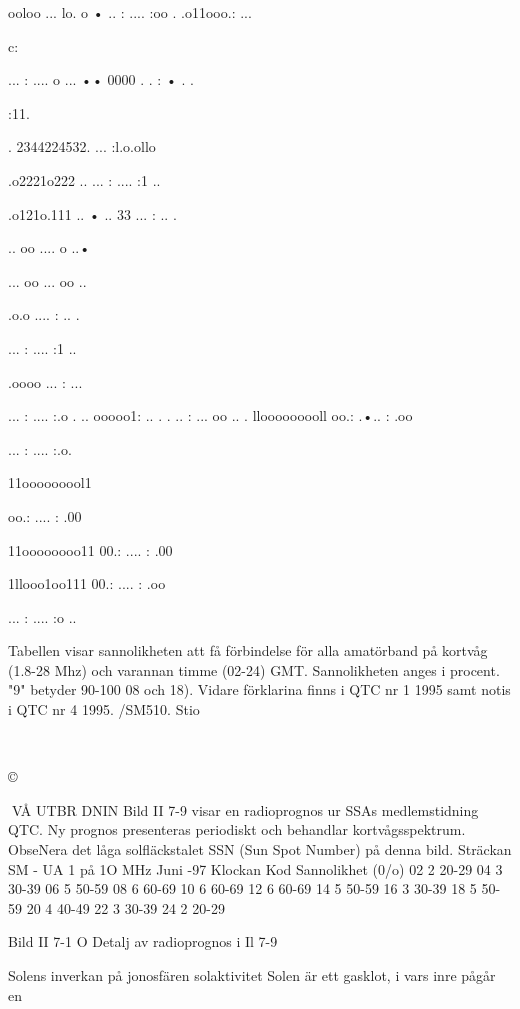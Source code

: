 ooloo ... lo. o
• .. : .... :oo .
.o11ooo.: ...

c:

... : .... o ...
•• 0000 . . : • . .

:11.

. 2344224532.
... :l.o.ollo

.o2221o222 ..
... : .... :1 ..

.o121o.111 ..
• .. 33 ... : .. .

.. oo .... o ..•

... oo ... oo ..

.o.o .... : .. .

... : .... :1 ..

.oooo ... : ...

... : .... :.o .
.. ooooo1: .. .
. .. : ... oo .. .
llooooooooll
oo.: .•.. : .oo

... : .... :.o.

11ooooooool1

oo.: .... : .00

11oooooooo11
00.: .... : .00

1llooo1oo111
00.: .... : .oo

... : .... :o ..

Tabellen visar sannolikheten att få förbindelse för alla amatörband på kortvåg (1.8-28 Mhz) och varannan timme (02-24) GMT. Sannolikheten
anges i procent. "9" betyder 90-100 %
08 och 18). Vidare förklarina finns i QTC nr 1 1995 samt notis i QTC nr 4 1995. /SM510. Stio

~

©

VÅ UTBR DNIN
Bild II 7-9 visar en radioprognos ur SSAs
medlemstidning QTC. Ny prognos presenteras periodiskt och behandlar kortvågsspektrum. ObseNera det låga solfläckstalet SSN
(Sun Spot Number) på denna bild.
Sträckan SM - UA 1 på 1O MHz Juni -97
Klockan
Kod
Sannolikhet (0/o)
02
2
20-29
04
3
30-39
06
5
50-59
08
6
60-69
10
6
60-69
12
6
60-69
14
5
50-59
16
3
30-39
18
5
50-59
20
4
40-49
22
3
30-39
24
2
20-29

Bild II 7-1 O Detalj av radioprognos i Il 7-9

Solens inverkan på jonosfären
solaktivitet
Solen är ett gasklot, i vars inre pågår en

